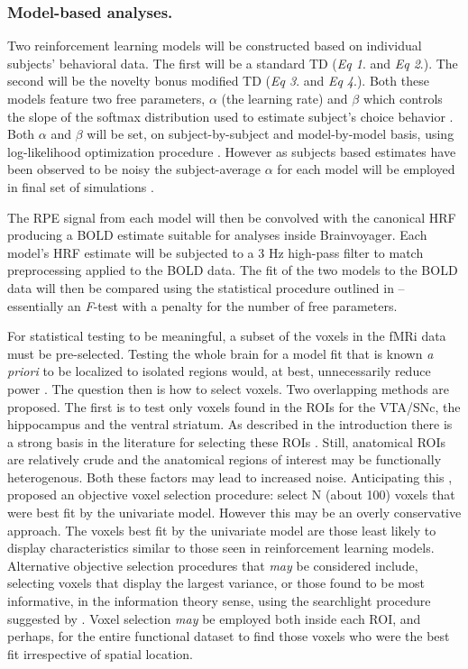 \documentclass[doc]{apa}        %
\begin{document}
\subsubsection{Model-based analyses.}
Two reinforcement learning models will be constructed based on individual subjects' behavioral data.  The first will be a standard TD (\emph{Eq 1}. and \emph{Eq 2}.). The second will be the novelty bonus modified TD (\emph{Eq 3}. and \emph{Eq 4}.).  Both these models feature two free parameters, $\alpha$ (the learning rate) and $\beta$ which controls the slope of the softmax distribution used to estimate subject's choice behavior \cite{Pessiglione:2006p6481,Sutton:1998fk}.  Both $\alpha$ and $\beta$ will be set, on subject-by-subject and model-by-model basis, using log-likelihood optimization procedure \cite{Pessiglione:2006p6481}.  However as subjects based estimates have been observed to be noisy the subject-average $\alpha$ for each model will be employed in final set of simulations \cite{Yacubian:2006p1676}.  

The RPE signal from each model will then be convolved with the canonical HRF producing a BOLD estimate suitable for analyses inside Brainvoyager.  Each model's HRF estimate will be subjected to a 3 Hz high-pass filter to match preprocessing applied to the BOLD data.  The fit of the two models to the BOLD data will then be compared using the statistical procedure outlined in  -- essentially an \emph{F}-test with a penalty for the number of free parameters.

For statistical testing to be meaningful, a subset of the voxels in the fMRi data must be pre-selected.  Testing the whole brain for a model fit that is known \emph{a priori} to be localized to isolated regions would, at best, unnecessarily reduce power \cite{Ashby:2008p7276}. The question then is how to select voxels.  Two overlapping methods are proposed.  The first is to test only voxels found in the ROIs for the VTA/SNc, the hippocampus and the ventral striatum.   As described in the introduction there is a strong basis in the literature for selecting these ROIs \cite{GuitartMasip:2010p7227,Seger:2010p7188,ODoherty:2003p6329,Haruno:2006p3979}.  Still, anatomical ROIs are relatively crude and the anatomical regions of interest may be functionally heterogenous.  Both these factors may lead to increased noise.   Anticipating this , proposed an objective voxel selection procedure: select N (about 100) voxels that were best fit by the univariate model.  However this may be an overly conservative approach.   The voxels best fit by the univariate model are those least likely to display characteristics similar to those seen in reinforcement learning models.  Alternative objective selection procedures that \emph{may} be considered include, selecting voxels that display the largest variance, or those found to be most informative, in the information theory sense, using the searchlight procedure suggested by .  Voxel selection \emph{may} be employed both inside each ROI, and perhaps, for the entire functional dataset to find those voxels who were the best fit irrespective of spatial location.  
\end{document}
